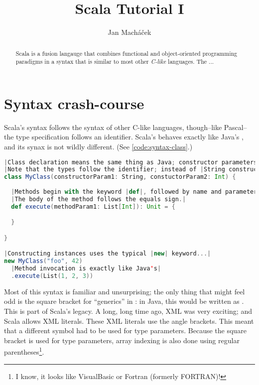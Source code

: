 \documentclass[10 pt]{article}
\title{Scala Tutorial I}
\author{Jan Macháček}
\begin{document}
\maketitle
\begin{abstract}
  Scala is a fusion langauge that combines functional and object-oriented programming paradigms in a syntax that is similar to most other \emph{C-like} languages. The ...
\end{abstract}
\bigskip

\section{Syntax crash-course}
Scala's syntax follows the syntax of other C-like languages, though--like Pascal--the type specification follows an identifier. Scala's  behaves exactly like Java's , and its synax is not wildly different. (See \autoref{code:syntax-class}.)

\begin{lstlisting}[caption={Classes and methods}, label={code:syntax-class}, language=Scala, escapechar=|]
|Class declaration means the same thing as Java; constructor parameters are specified in the block immediately following the class name.|
|Note that the types follow the identifier; instead of |String constructorParam1| Scala uses |constructorParam1: String
class MyClass(constructorParam1: String, constuctorParam2: Int) {
  
  |Methods begin with the keyword |def|, followed by name and parameters. The return type follows similar pattern; |Unit| means |void.
  |The body of the method follows the equals sign.|
  def execute(methodParam1: List[Int]): Unit = {

  }

}

|Constructing instances uses the typical |new| keyword...|
new MyClass("foo", 42)
  |Method invocation is exactly like Java's|
  .execute(List(1, 2, 3))
\end{lstlisting}

Most of this syntax is familiar and unsurprising; the only thing that might feel odd is the square bracket for ``generics'' in : in Java, this would be written as . This is part of Scala's legacy. A long, long time ago, XML was very exciting; and Scala allows XML literals. These XML literals use the angle brackets. This meant that a different symbol had to be used for type parameters. Because the square bracket is used for type parameters, array indexing is also done using regular parentheses\footnote{I know, it looks like VisualBasic or Fortran (formerly FORTRAN)!}.
\end{document}
